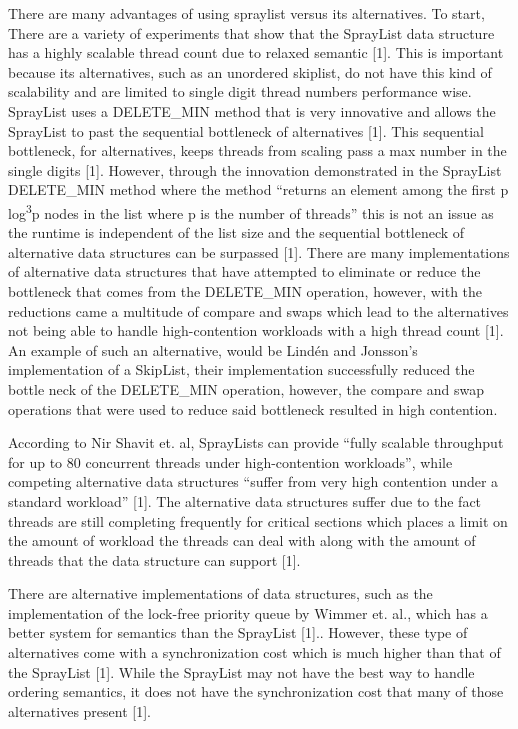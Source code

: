 \documentclass[conference]{IEEEtran}
\begin{document}
There are many advantages of using spraylist versus its alternatives. To start, There are a variety of experiments that show that the SprayList data structure has a highly scalable thread count due to relaxed semantic [1]. This is important because its alternatives, such as an unordered skiplist, do not have this kind of scalability and are limited to single digit thread numbers performance wise. SprayList uses a DELETE\_MIN method that is very innovative and allows the SprayList to past the sequential bottleneck of alternatives [1]. This sequential bottleneck, for alternatives, keeps threads from scaling pass a max number in the single digits [1]. However, through the innovation demonstrated in the SprayList DELETE\_MIN method where the method “returns an element among the first p log\textsuperscript{3}p nodes in the list where p is the number of threads” this is not an issue as the runtime is independent of the list size and the sequential bottleneck of alternative data structures can be surpassed [1]. There are many implementations of alternative data structures that have attempted to eliminate or reduce the bottleneck that comes from the DELETE\_MIN operation, however, with the reductions came a multitude of compare and swaps which lead to the alternatives not being able to handle high-contention workloads with a high thread count [1]. An example of such an alternative, would be Lindén and Jonsson’s implementation of a SkipList, their implementation successfully reduced the bottle neck of the DELETE\_MIN operation, however, the compare and swap operations that were used to reduce said bottleneck resulted in high contention. 

According to Nir Shavit et. al, SprayLists can provide “fully scalable throughput for up to 80 concurrent threads under high-contention workloads”, while competing alternative data structures “suffer from very high contention under a standard workload” [1]. The alternative data structures suffer due to the fact threads are still completing frequently for critical sections which places a limit on the amount of workload the threads can deal with along with the amount of threads that the data structure can support [1]. 

There are alternative implementations of data structures, such as the implementation of the lock-free priority queue by Wimmer et. al., which has a better system for semantics than the SprayList [1].. However, these type of alternatives come with a synchronization cost which is much higher than that of the SprayList [1]. While the SprayList may not have the best way to handle ordering semantics, it does not have the synchronization cost that many of those alternatives present [1].
\end{document}
